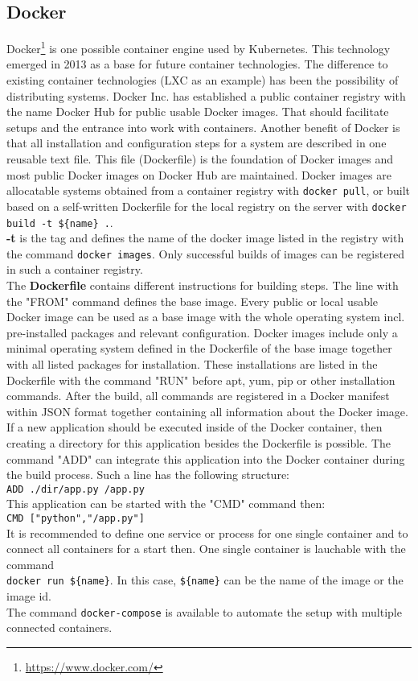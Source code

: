 \subsection{Docker}

Docker\footnote{\url{https://www.docker.com/}} is one possible container engine used by Kubernetes. This technology emerged in 2013 as a base for future container technologies. 
The difference to existing container technologies (LXC as an example) has been the possibility of distributing systems. 
Docker Inc. has established a public container registry with the name Docker Hub for public usable Docker images. That should facilitate setups and the entrance into work with containers. Another benefit of Docker is that all installation and configuration steps for a system are described in one reusable text file. 
This file (Dockerfile) is the foundation of Docker images and most public Docker images on Docker Hub are maintained.
Docker images are allocatable systems obtained from a container registry with \lstinline!docker pull!, or built based on a self-written Dockerfile for the local registry on the server with \lstinline!docker build -t ${name} .!. \\ \textbf{-t} is the tag and defines the name of the docker image listed in the registry with the command \lstinline!docker images!. Only successful builds of images can be registered in such a container registry. \\
The \textbf{Dockerfile} contains different instructions for building steps. The line with the "FROM" command defines the base image. Every public or local usable Docker image can be used as a base image with the whole operating system incl. pre-installed packages and relevant configuration. Docker images include only a minimal operating system defined in the Dockerfile of the base image together with all listed packages for installation. These installations are listed in the Dockerfile with the command "RUN" before apt, yum, pip or other installation commands. 
After the build, all commands are registered in a Docker manifest within JSON format together containing all information about the Docker image.
If a new application should be executed inside of the Docker container, then creating a directory for this application besides the Dockerfile is possible. The command "ADD" can integrate this application into the Docker container during the build process. Such a line has the following structure: \\
\lstinline!ADD ./dir/app.py /app.py! \\
This application can be started with the "CMD" command then: \\
\lstinline!CMD ["python","/app.py"]! \\
It is recommended to define one service or process for one single container and to connect all containers for a start then. One single container is lauchable with the command \\
\lstinline!docker run ${name}!. In this case, \lstinline!${name}! can be the name of the image or the image id. \\
The command \lstinline!docker-compose! is available to automate the setup with multiple connected containers. 

